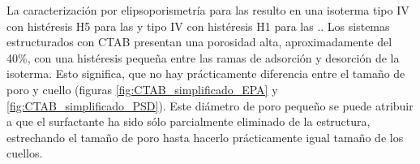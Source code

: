 			La caracterización por elipsoporismetría para las \pdmF\space resulto en una isoterma tipo IV con histéresis H5 para las \pdmC\space y tipo IV con histéresis H1 para las \pdmF.\cite{Thommes2015}. Los sistemas estructurados con CTAB presentan una porosidad alta, aproximadamente del 40\%, con una histéresis pequeña entre las ramas de adsorción y desorción de la isoterma. Esto significa, que no hay prácticamente diferencia entre el tamaño de poro y cuello (figuras \ref{fig:CTAB_simplificado_EPA}  y \ref{fig:CTAB_simplificado_PSD}). Este diámetro de poro pequeño se puede atribuir a que el surfactante ha sido sólo parcialmente eliminado de la estructura, estrechando el tamaño de poro hasta hacerlo prácticamente igual tamaño de los cuellos.
